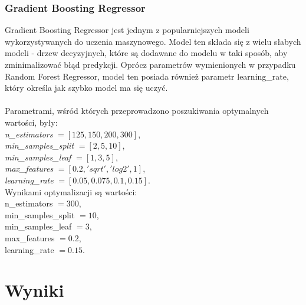 \documentclass{article}
\begin{document}
\subsubsection{Gradient Boosting Regressor}
Gradient Boosting Regressor jest jednym z popularniejszych modeli wykorzystywanych do uczenia maszynowego.
Model ten składa się z wielu słabych modeli - drzew decyzyjnych, które są dodawane do modelu w taki sposób, aby zminimalizować błąd predykcji.
Oprócz parametrów wymienionych w przypadku Random Forest Regressor, model ten posiada również parametr learning\_rate, który określa jak szybko model ma się uczyć. \\ \\
Parametrami, wśród których przeprowadzono poszukiwania optymalnych wartości, były: \\
\textit{n\_estimators} $= [125,150,200,300]$, \\
\textit{min\_samples\_split} $= [2, 5, 10]$, \\
\textit{min\_samples\_leaf} $= [1, 3, 5]$, \\
\textit{max\_features} $= [0.2, 'sqrt', 'log2', 1]$, \\
\textit{learning\_rate} $= [0.05, 0.075,0.1,0.15]$. \\
Wynikami optymalizacji są wartości:\\
n\_estimators $= 300$, \\
min\_samples\_split $= 10$, \\
min\_samples\_leaf $= 3$, \\
max\_features $= 0.2$, \\
learning\_rate $= 0.15$. \\

\pagebreak

\section{Wyniki}
\end{document}
